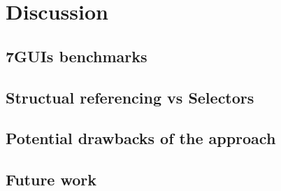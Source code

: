 \chapter{Discussion}
\label{chap:discussion}



\section{7GUIs benchmarks}


\section{Structual referencing vs Selectors}


\section{Potential drawbacks of the approach}


\section{Future work}

